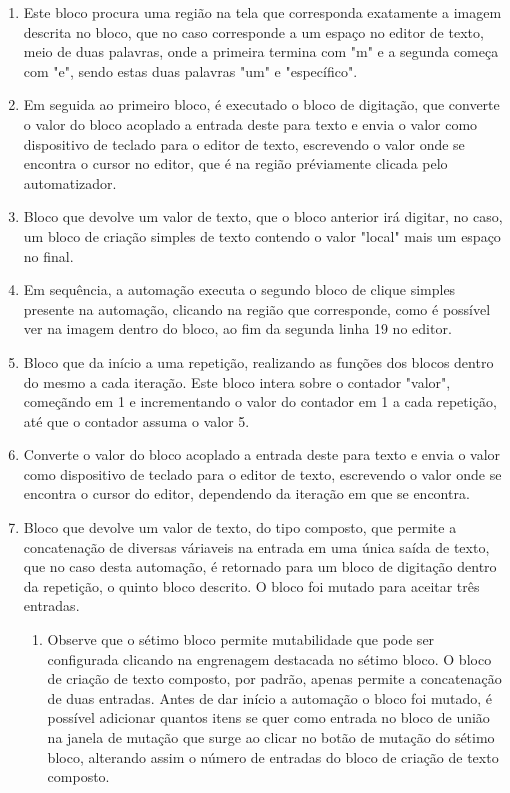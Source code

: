 \documentclass[tg]{mdtufsm}
\begin{document}
                \begin{enumerate}[label*=\arabic*.]
                    \item Este bloco procura uma região na tela que corresponda exatamente a imagem descrita no bloco, que no caso corresponde a um espaço no editor de texto, meio de duas palavras, onde a primeira termina com "m" e a segunda começa com "e", sendo estas duas palavras "um" e "específico".
                    \item Em seguida ao primeiro bloco, é executado o bloco de digitação, que converte o valor do bloco acoplado a entrada deste para texto e envia o valor como dispositivo de teclado para o editor de texto, escrevendo o valor onde se encontra o cursor no editor, que é na região préviamente clicada pelo automatizador.
                    \item Bloco que devolve um valor de texto, que o bloco anterior irá digitar, no caso, um bloco de criação simples de texto contendo o valor "local" mais um espaço no final.
                    \item Em sequência, a automação executa o segundo bloco de clique simples presente na automação, clicando na região que corresponde, como é possível ver na imagem dentro do bloco, ao fim da segunda linha 19 no editor.
                    \item Bloco que da início a uma repetição, realizando as funções dos blocos dentro do mesmo a cada iteração. Este bloco intera sobre o contador "valor", começãndo em 1 e incrementando o valor do contador em 1 a cada repetição, até que o contador assuma o valor 5.
                    \item Converte o valor do bloco acoplado a entrada deste para texto e envia o valor como dispositivo de teclado para o editor de texto, escrevendo o valor onde se encontra o cursor do editor, dependendo da iteração em que se encontra.
                    \item Bloco que devolve um valor de texto, do tipo composto, que permite a concatenação de diversas váriaveis na entrada em uma única saída de texto, que no caso desta automação, é retornado para um bloco de digitação dentro da repetição, o quinto bloco descrito. O bloco foi mutado para aceitar três entradas.
                    \begin{enumerate}[label*=\arabic*.]
                        \item Observe que o sétimo bloco permite mutabilidade que pode ser configurada clicando na engrenagem destacada no sétimo bloco. O bloco de criação de texto composto, por padrão, apenas permite a concatenação de duas entradas. Antes de dar início a automação o bloco foi mutado, é possível adicionar quantos itens se quer como entrada no bloco de união na janela de mutação que surge ao clicar no botão de mutação do sétimo bloco, alterando assim o número de entradas do bloco de criação de texto composto.

\end{enumerate}
\end{enumerate}
\end{document}
